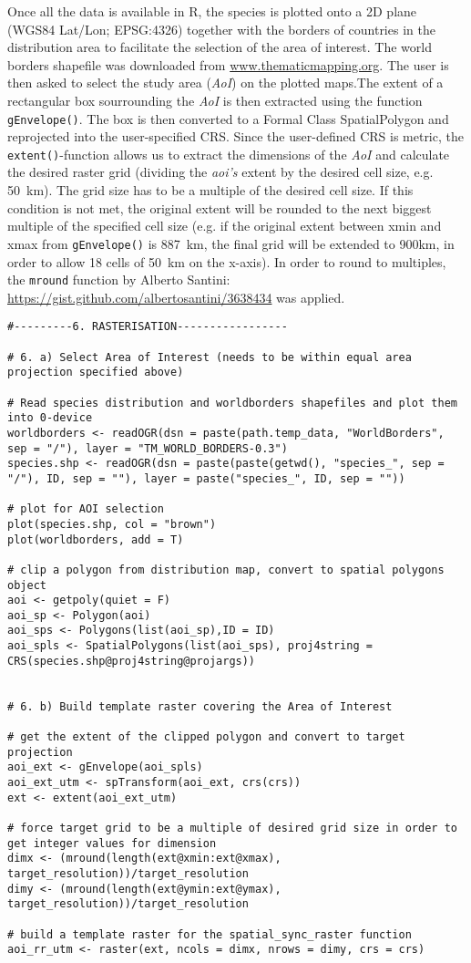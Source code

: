 \documentclass[11pt, a4paper]{article}\usepackage[]{graphicx}\usepackage[]{color}
\begin{document}
Once all the data is available in R, the species is plotted onto a 2D plane (WGS84 Lat/Lon; EPSG:4326) together with the borders of countries in the distribution area to facilitate the selection of the area of interest. The world borders shapefile was downloaded from \url{www.thematicmapping.org}. The user is then asked to select the study area (\textit{AoI}) on the plotted maps.The extent of a rectangular box sourrounding the \textit{AoI} is then extracted using the function \texttt{gEnvelope()}. The box is then converted to a Formal Class SpatialPolygon and reprojected into the user-specified CRS. Since the user-defined CRS is metric, the \texttt{extent()}-function allows us to extract the dimensions of the \textit{AoI} and calculate the desired raster grid (dividing the \textit{aoi's} extent by the desired cell size, e.g. 50~km). The grid size has to be a multiple of the desired cell size. If this condition is not met, the original extent will be rounded to the next biggest multiple of the specified cell size (e.g. if the original extent between xmin and xmax from \texttt{gEnvelope()} is 887~km, the final grid will be extended to 900km, in order to allow 18 cells of 50~km on the x-axis). In order to round to multiples, the \texttt{mround} function by Alberto Santini: \url{https://gist.github.com/albertosantini/3638434} was applied.\newline

\begin{verbatim}
#---------6. RASTERISATION-----------------

# 6. a) Select Area of Interest (needs to be within equal area projection specified above)

# Read species distribution and worldborders shapefiles and plot them into 0-device
worldborders <- readOGR(dsn = paste(path.temp_data, "WorldBorders", sep = "/"), layer = "TM_WORLD_BORDERS-0.3")
species.shp <- readOGR(dsn = paste(paste(getwd(), "species_", sep = "/"), ID, sep = ""), layer = paste("species_", ID, sep = ""))

# plot for AOI selection
plot(species.shp, col = "brown")
plot(worldborders, add = T)

# clip a polygon from distribution map, convert to spatial polygons object
aoi <- getpoly(quiet = F)
aoi_sp <- Polygon(aoi)
aoi_sps <- Polygons(list(aoi_sp),ID = ID)
aoi_spls <- SpatialPolygons(list(aoi_sps), proj4string = CRS(species.shp@proj4string@projargs))


# 6. b) Build template raster covering the Area of Interest

# get the extent of the clipped polygon and convert to target projection
aoi_ext <- gEnvelope(aoi_spls)
aoi_ext_utm <- spTransform(aoi_ext, crs(crs))
ext <- extent(aoi_ext_utm)

# force target grid to be a multiple of desired grid size in order to get integer values for dimension
dimx <- (mround(length(ext@xmin:ext@xmax), target_resolution))/target_resolution
dimy <- (mround(length(ext@ymin:ext@ymax), target_resolution))/target_resolution

# build a template raster for the spatial_sync_raster function
aoi_rr_utm <- raster(ext, ncols = dimx, nrows = dimy, crs = crs)
\end{verbatim}
\end{document}
